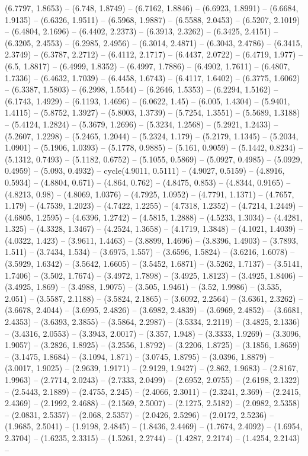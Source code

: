 (6.7797, 1.8653) -- (6.748, 1.8749) -- (6.7162, 1.8846) -- (6.6923, 1.8991) -- (6.6684, 1.9135) -- (6.6326, 1.9511) -- (6.5968, 1.9887) -- (6.5588, 2.0453) -- (6.5207, 2.1019) -- (6.4804, 2.1696) -- (6.4402, 2.2373) -- (6.3913, 2.3262) -- (6.3425, 2.4151) -- (6.3205, 2.4553) -- (6.2985, 2.4956) -- (6.3014, 2.4871) -- (6.3043, 2.4786) -- (6.3415, 2.3749) -- (6.3787, 2.2712) -- (6.4112, 2.1717) -- (6.4437, 2.0722) -- (6.4719, 1.977) -- (6.5, 1.8817) -- (6.4999, 1.8352) -- (6.4997, 1.7886) -- (6.4902, 1.7611) -- (6.4807, 1.7336) -- (6.4632, 1.7039) -- (6.4458, 1.6743) -- (6.4117, 1.6402) -- (6.3775, 1.6062) -- (6.3387, 1.5803) -- (6.2998, 1.5544) -- (6.2646, 1.5353) -- (6.2294, 1.5162) -- (6.1743, 1.4929) -- (6.1193, 1.4696) -- (6.0622, 1.45) -- (6.005, 1.4304) -- (5.9401, 1.4115) -- (5.8752, 1.3927) -- (5.8003, 1.3739) -- (5.7254, 1.3551) -- (5.5689, 1.3188) -- (5.4124, 1.2824) -- (5.3679, 1.2696) -- (5.3234, 1.2568) -- (5.2921, 1.2433) -- (5.2607, 1.2298) -- (5.2465, 1.2044) -- (5.2324, 1.179) -- (5.2179, 1.1345) -- (5.2034, 1.0901) -- (5.1906, 1.0393) -- (5.1778, 0.9885) -- (5.161, 0.9059) -- (5.1442, 0.8234) -- (5.1312, 0.7493) -- (5.1182, 0.6752) -- (5.1055, 0.5869) -- (5.0927, 0.4985) -- (5.0929, 0.4959) -- (5.093, 0.4932) -- cycle(4.9011, 0.5111) -- (4.9027, 0.5159) -- (4.8916, 0.5934) -- (4.8804, 0.671) -- (4.864, 0.762) -- (4.8475, 0.853) -- (4.8344, 0.9165) -- (4.8213, 0.98) -- (4.8069, 1.0376) -- (4.7925, 1.0952) -- (4.7791, 1.1371) -- (4.7657, 1.179) -- (4.7539, 1.2023) -- (4.7422, 1.2255) -- (4.7318, 1.2352) -- (4.7214, 1.2449) -- (4.6805, 1.2595) -- (4.6396, 1.2742) -- (4.5815, 1.2888) -- (4.5233, 1.3034) -- (4.4281, 1.325) -- (4.3328, 1.3467) -- (4.2524, 1.3658) -- (4.1719, 1.3848) -- (4.1021, 1.4039) -- (4.0322, 1.423) -- (3.9611, 1.4463) -- (3.8899, 1.4696) -- (3.8396, 1.4903) -- (3.7893, 1.511) -- (3.7434, 1.534) -- (3.6975, 1.557) -- (3.6596, 1.5824) -- (3.6216, 1.6078) -- (3.5929, 1.6342) -- (3.5642, 1.6605) -- (3.5452, 1.6871) -- (3.5262, 1.7137) -- (3.5141, 1.7406) -- (3.502, 1.7674) -- (3.4972, 1.7898) -- (3.4925, 1.8123) -- (3.4925, 1.8406) -- (3.4925, 1.869) -- (3.4988, 1.9075) -- (3.505, 1.9461) -- (3.52, 1.9986) -- (3.535, 2.051) -- (3.5587, 2.1188) -- (3.5824, 2.1865) -- (3.6092, 2.2564) -- (3.6361, 2.3262) -- (3.6678, 2.4044) -- (3.6995, 2.4826) -- (3.6982, 2.4839) -- (3.6969, 2.4852) -- (3.6681, 2.4353) -- (3.6393, 2.3855) -- (3.5864, 2.2987) -- (3.5334, 2.2119) -- (3.4825, 2.1336) -- (3.4316, 2.0553) -- (3.3943, 2.0017) -- (3.357, 1.948) -- (3.3333, 1.9269) -- (3.3096, 1.9057) -- (3.2826, 1.8925) -- (3.2556, 1.8792) -- (3.2206, 1.8725) -- (3.1856, 1.8659) -- (3.1475, 1.8684) -- (3.1094, 1.871) -- (3.0745, 1.8795) -- (3.0396, 1.8879) -- (3.0017, 1.9025) -- (2.9639, 1.9171) -- (2.9129, 1.9427) -- (2.862, 1.9683) -- (2.8167, 1.9963) -- (2.7714, 2.0243) -- (2.7333, 2.0499) -- (2.6952, 2.0755) -- (2.6198, 2.1322) -- (2.5443, 2.1889) -- (2.4755, 2.245) -- (2.4066, 2.3011) -- (2.3241, 2.369) -- (2.2415, 2.4369) -- (2.1992, 2.4688) -- (2.1569, 2.5007) -- (2.1275, 2.5182) -- (2.0982, 2.5358) -- (2.0831, 2.5357) -- (2.068, 2.5357) -- (2.0426, 2.5296) -- (2.0172, 2.5236) -- (1.9685, 2.5041) -- (1.9198, 2.4845) -- (1.8436, 2.4469) -- (1.7674, 2.4092) -- (1.6954, 2.3704) -- (1.6235, 2.3315) -- (1.5261, 2.2744) -- (1.4287, 2.2174) -- (1.4254, 2.2143) -- 